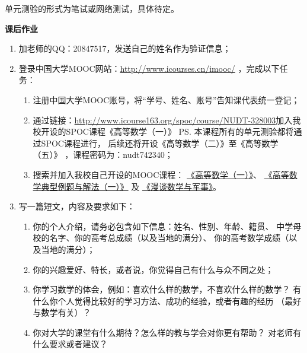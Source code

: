 单元测验的形式为笔试或网络测试，具体待定。

\newpage

\begin{ext}
	\begin{center}
		\bf 课后作业
	\end{center}
	
	
	\begin{enumerate}
	  \item 加老师的QQ：20847517，发送自己的姓名作为验证信息；
	  \item 登录中国大学MOOC网站：\href{http://www.icourses.cn/imooc/}
	  {http://www.icourses.cn/imooc/}
	  ，完成以下任务：
	  \begin{enumerate}[(1)]
	  	\item 注册中国大学MOOC账号，将“学号、姓名、账号”告知课代表统一登记；
	  	\item 通过链接：\href{http://www.icourse163.org/spoc/course/NUDT-328003}
	  	{http://www.icourse163.org/spoc/course/NUDT-328003}加入我校开设的SPOC课程《高等数学（一）》
	  	\ps{本课程所有的单元测验都将通过SPOC课程进行，
	  	后续还将开设《高等数学（二）》至《高等数学（五）》}
	  	，课程密码为：nudt742340；
	  	\item 搜索并加入我校自己开设的MOOC课程：
	  	\href{https://www.icourse163.org/course/NUDT-9004}
	  	{《高等数学（一）》}、
	  	\href{https://www.icourse163.org/course/NUDT-1001616011}
	  	{《高等数学典型例题与解法（一）》}
	  	及
	  	\href{https://www.icourse163.org/course/NUDT-1002011022}
	  	{《漫谈数学与军事》}。
	  \end{enumerate}
	  \item 写一篇短文，内容及要求如下：
	  \begin{enumerate}[(1)]
	    \item 你的个人介绍，请务必包含如下信息：姓名、性别、年龄、籍贯、
	    中学母校的名字、你的高考总成绩（以及当地的满分）、
	    你的高考数学成绩（以及当地的满分）；
	    \item 你的兴趣爱好、特长，或者说，你觉得自己有什么与众不同之处；
	    \item 你学习数学的体会，例如：喜欢什么样的数学，不喜欢什么样的数学？
	    有什么你个人觉得比较好的学习方法、成功的经验，或者有趣的经历
	    （最好与数学有关）？
	    \item 你对大学的课堂有什么期待？怎么样的教与学会对你更有帮助？
	    对老师有什么要求或者建议？

\end{enumerate}
\end{enumerate}
\end{ext}
